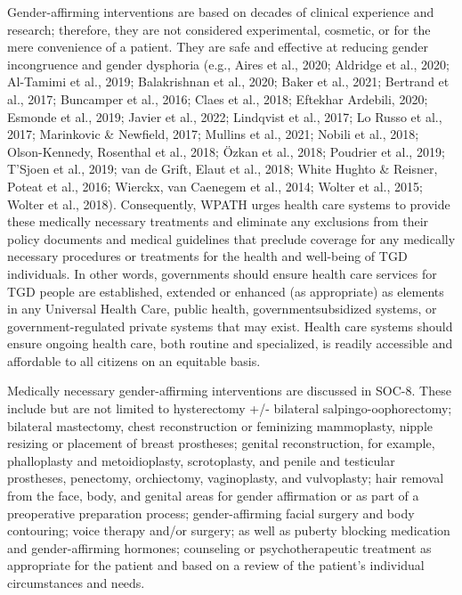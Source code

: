 \documentclass[
]{book}
\begin{document}
Gender-affirming interventions are based on
decades of clinical experience and research; therefore, they are not considered experimental, cosmetic, or for the mere convenience of a patient.
They are safe and effective at reducing gender
incongruence and gender dysphoria (e.g., Aires
et al., 2020; Aldridge et al., 2020; Al-Tamimi et al.,
2019; Balakrishnan et al., 2020; Baker et al., 2021;
Bertrand et al., 2017; Buncamper et al., 2016; Claes
et al., 2018; Eftekhar Ardebili, 2020; Esmonde et al.,
2019; Javier et al., 2022; Lindqvist et al., 2017; Lo
Russo et al., 2017; Marinkovic \& Newfield, 2017;
Mullins et al., 2021; Nobili et al., 2018;
Olson-Kennedy, Rosenthal et al., 2018; Özkan et al.,
2018; Poudrier et al., 2019; T'Sjoen et al., 2019; van
de Grift, Elaut et al., 2018; White Hughto \& Reisner,
Poteat et al., 2016; Wierckx, van Caenegem et al.,
2014; Wolter et al., 2015; Wolter et al., 2018).
Consequently, WPATH urges health care systems
to provide these medically necessary treatments and
eliminate any exclusions from their policy documents and medical guidelines that preclude coverage
for any medically necessary procedures or treatments for the health and well-being of TGD individuals. In other words, governments should ensure
health care services for TGD people are established,
extended or enhanced (as appropriate) as elements
in any Universal Health Care, public health, governmentsubsidized systems, or government-regulated private
systems that may exist. Health care systems should
ensure ongoing health care, both routine and specialized, is readily accessible and affordable to all
citizens on an equitable basis.

Medically necessary gender-affirming interventions are discussed in SOC-8. These include but
are not limited to hysterectomy +/- bilateral
salpingo-oophorectomy; bilateral mastectomy,
chest reconstruction or feminizing mammoplasty,
nipple resizing or placement of breast prostheses;
genital reconstruction, for example, phalloplasty
and metoidioplasty, scrotoplasty, and penile and
testicular prostheses, penectomy, orchiectomy,
vaginoplasty, and vulvoplasty; hair removal from
the face, body, and genital areas for gender affirmation or as part of a preoperative preparation
process; gender-affirming facial surgery and body
contouring; voice therapy and/or surgery; as well
as puberty blocking medication and
gender-affirming hormones; counseling or psychotherapeutic treatment as appropriate for the
patient and based on a review of the patient's
individual circumstances and needs.
\end{document}
